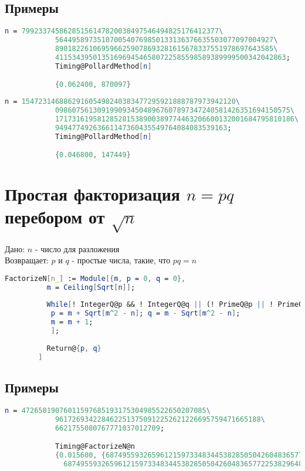     	\subsection{Примеры}

	    	\begin{lstlisting}[language=Mathematica,caption={
	      		Пример 1
	    	}]
			n = 79923374586285156147820038497546494825176412377\
			5644958973510700540769850133136376635503077097004927\
			8901822610695966259078693281615678337551978697643585\
			4115343950135169694546580722585598589389999500342042863;
			Timing@PollardMethod[n]

			{0.062400, 870097}
	    	\end{lstlisting}

	    	\begin{lstlisting}[language=Mathematica,caption={
	      		Пример 2
	    	}]
			n = 154723146886291605498240383477295921888787973942120\
			09860756130919909345048967607897347240581426351694150575\
			171731619581285281538900389774463206600132001684795810186\
			94947749263661147360435549764084083539163;
			Timing@PollardMethod[n]

			{0.046800, 147449}
	    	\end{lstlisting}

	\section{Простая факторизация $n = p q$ перебором от $\sqrt{n}$}
		Дано: $n$ - число для разложения\\
		Возвращает: $p$ и $q$ - простые числа, такие, что $p q = n$

		\begin{lstlisting}[language=Mathematica,caption={
      		Факторизация перебором
    	}]
		FactorizeN[n_] := Module[{m, p = 0, q = 0},
		  m = Ceiling[Sqrt[n]];
		  
		  While[! IntegerQ@p && ! IntegerQ@q || (! PrimeQ@p || ! PrimeQ@q),
		   p = m + Sqrt[m^2 - n]; q = m - Sqrt[m^2 - n];
		   m = m + 1;
		   ];
		  
		  Return@{p, q}
		]
    	\end{lstlisting}

    	\subsection{Примеры}

	    	\begin{lstlisting}[language=Mathematica,caption={
	      		Пример 1
	    	}]
			n = 47265019076011597685193175304985522650207085\
			9617269342284622513750912252621226695759471665188\
			6621755080767771037012709;

			Timing@FactorizeN@n
			{0.015600, {68749559326596121597334834453828505042604836577225382964179, 
			  68749559326596121597334834453828505042604836577225382964071}}
	    	\end{lstlisting}

